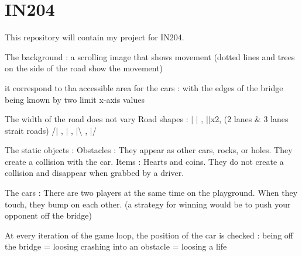 \chapter{IN204}
\hypertarget{md__r_e_a_d_m_e}{}\label{md__r_e_a_d_m_e}
\label{md__r_e_a_d_m_e_autotoc_md0}%
%
This repository will contain my project for IN204.

The background \+: a scrolling image that shows movement (dotted lines and trees on the side of the road show the movement)

it correspond to tha accessible area for the cars \+: with the edges of the bridge being known by two limit x-\/axis values

The width of the road does not vary Road shapes \+: \texorpdfstring{$\vert$}{|} \texorpdfstring{$\vert$}{|} , \texorpdfstring{$\vert$}{|}\texorpdfstring{$\vert$}{|}x2, (2 lanes \& 3 lanes strait roads) /\texorpdfstring{$\vert$}{|} , $|$ , \texorpdfstring{$\vert$}{|}\textbackslash{} , \texorpdfstring{$\vert$}{|}/

The static objects \+: Obstacles \+: They appear as other cars, rocks, or holes. They create a collision with the car. Items \+: Hearts and coins. They do not create a collision and disappear when grabbed by a driver.

The cars \+: There are two players at the same time on the playground. When they touch, they bump on each other. (a strategy for winning would be to push your opponent off the bridge)

At every iteration of the game loop, the position of the car is checked \+: being off the bridge = loosing crashing into an obstacle = loosing a life 